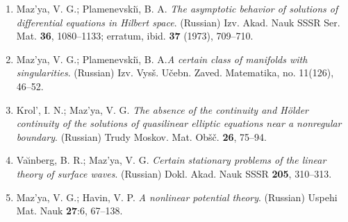 \documentclass{article}
\begin{document}
\begin{enumerate}
{Differentialoperatoren}. In the book: Michlin, S. G. Lehrgang der
mathematischen Physik. (German)  \"Ubersetzung aus dem Russischen:
  Mathematische
Lehrb\"ucher und Monographien. I. Abteilung: Mathematische
Lehrb\"ucher,
Band XV. Akademie-Verlag, Berlin, 1972. xiv+475 pp.;
extended version in: Mitteilungen der Math. Gesellschaft der DDR
(1975)
H.1, 92-116.
\item Maz'ya, V. G.; Plamenevski{\u\i}, B. A. {\it The asymptotic
behavior
of solutions of differential
equations in Hilbert space}. (Russian) Izv. Akad. Nauk SSSR Ser. Mat.
{\bf
36}, 1080--1133; erratum, ibid. {\bf 37} (1973),
709--710.
\item Maz'ya, V. G.; Plamenevski{\u\i}, B. A.{\it  A certain class of
manifolds with singularities}.
(Russian) Izv. Vys\v s. U\v cebn. Zaved. Matematika, no. 11(126),
46--52.
\item Krol', I. N.; Maz'ya, V. G. {\it The absence of the continuity
and
H\"older continuity of the solutions of quasilinear elliptic equations
near
a nonregular boundary}. (Russian) Trudy Moskov. Mat. Ob\v s\v c. {\bf
26},
75--94.
\item Va{\u\i}nberg, B. R.; Maz'ya, V. G. {\it Certain stationary
problems
of the linear theory
of surface waves}. (Russian) Dokl. Akad. Nauk SSSR {\bf 205},
310--313.
\item Maz'ya, V. G.; Havin, V. P. {\it A nonlinear potential theory}.
(Russian) Uspehi Mat. Nauk {\bf 27}:6, 67--138.\hfill\break


\end{enumerate}
\end{document}
